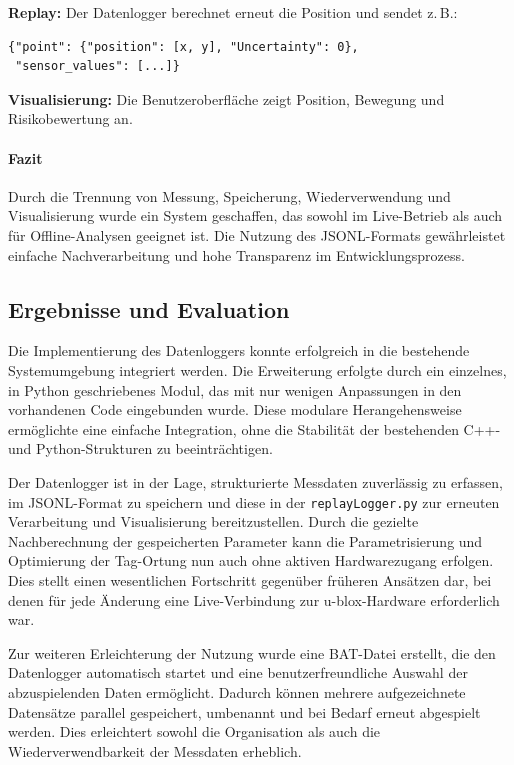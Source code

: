 \documentclass[a4paper, 12pt]{article} %
\begin{document}
\textbf{Replay:}  
Der Datenlogger berechnet erneut die Position und sendet z.\,B.:

\begin{verbatim}
{"point": {"position": [x, y], "Uncertainty": 0}, 
 "sensor_values": [...]}
\end{verbatim}

\textbf{Visualisierung:}  
Die Benutzeroberfläche zeigt Position, Bewegung und Risikobewertung an.

\paragraph{Fazit}

Durch die Trennung von Messung, Speicherung, Wiederverwendung und Visualisierung wurde ein System geschaffen, 
das sowohl im Live-Betrieb als auch für Offline-Analysen geeignet ist. Die Nutzung des \ac{JSONL}-Formats gewährleistet einfache 
Nachverarbeitung und hohe Transparenz im Entwicklungsprozess.

\subsection{Ergebnisse und Evaluation}

Die Implementierung des Datenloggers konnte erfolgreich in die bestehende Systemumgebung integriert werden. Die Erweiterung 
erfolgte durch ein einzelnes, in Python geschriebenes Modul, das mit nur wenigen Anpassungen in den vorhandenen Code eingebunden wurde. 
Diese modulare Herangehensweise ermöglichte eine einfache Integration, ohne die Stabilität der bestehenden C++- und Python-Strukturen zu beeinträchtigen.

Der Datenlogger ist in der Lage, strukturierte Messdaten zuverlässig zu erfassen, im \ac{JSONL}-Format zu speichern und diese in der 
\texttt{replayLogger.py} zur erneuten Verarbeitung und Visualisierung bereitzustellen. Durch die gezielte Nachberechnung der gespeicherten 
Parameter kann die Parametrisierung und Optimierung der Tag-Ortung nun auch ohne aktiven Hardwarezugang erfolgen. Dies stellt einen wesentlichen
 Fortschritt gegenüber früheren Ansätzen dar, bei denen für jede Änderung eine Live-Verbindung zur u-blox-Hardware erforderlich war.

Zur weiteren Erleichterung der Nutzung wurde eine \acf{BAT}-Datei erstellt, die den Datenlogger automatisch 
startet und eine benutzerfreundliche Auswahl der abzuspielenden Daten ermöglicht. Dadurch können mehrere aufgezeichnete Datensätze
 parallel gespeichert, umbenannt und bei Bedarf erneut abgespielt werden. Dies erleichtert sowohl die Organisation als auch die Wiederverwendbarkeit
  der Messdaten erheblich.
\end{document}
